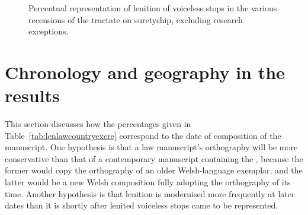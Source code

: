   \begin{figure}[h]
    \centering
    \caption{Percentual representation of lenition of voiceless stops in the various recensions of the tractate on suretyship, excluding research exceptions.}
    \label{fig:barchartlaws}
  \end{figure}

\section{Chronology and geography in the results}
\label{sec:chronology-laws}

This section discusses how the percentages given in Table~\ref{tab:lenlawcountryexcre} correspond to the date of composition of the manuscript. One hypothesis is that a law manuscript's orthography will be more conservative than that of a contemporary manuscript containing the , because the former would  copy the orthography of an older Welsh-language exemplar, and the latter would be a new Welsh composition fully adopting the orthography of its time. Another hypothesis is that lenition is modernised more frequently at later dates than it is shortly after lenited voiceless stops came to be represented.



